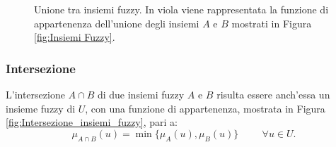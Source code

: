 \documentclass[a4paper,12pt]{report}
\begin{document}
\begin{figure}[h]
    \centering
    \caption{Unione tra insiemi fuzzy. In viola viene rappresentata la funzione di appartenenza dell'unione degli insiemi $A$ e $B$ mostrati in Figura \ref{fig:Insiemi Fuzzy}.}
    \label{fig:Unione_Insiemi_Fuzzy}   

\end{figure}

\subsubsection{Intersezione}
L'intersezione $A \cap B$ di due insiemi fuzzy $A$ e $B$ risulta essere anch'essa un insieme fuzzy di $U$, con una funzione di appartenenza, mostrata in Figura \ref{fig:Intersezione_insiemi_fuzzy}, pari a:
\begin{equation*}
    \mu_{A \cap B} (u) = \min\{\mu_A(u),\mu_B(u)\} \hspace{1cm}  \forall u\in U.
\end{equation*}
\end{document}
